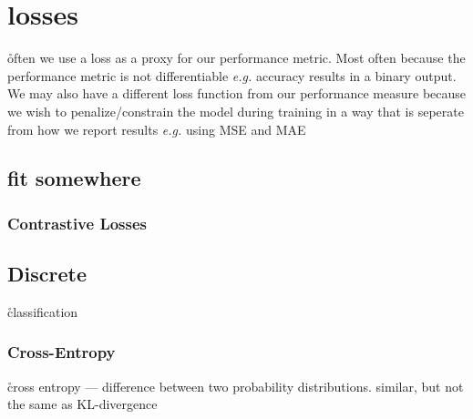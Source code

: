 
\section{losses}



\r{often we use a loss as a proxy for our performance metric. Most often because the performance metric is not differentiable \textit{e.g.} accuracy results in a binary output. We may also have a different loss function from our performance measure because we wish to penalize/constrain the model during training in a way that is seperate from how we report results \textit{e.g.} using MSE and MAE}


\subsection{fit somewhere}



\subsubsection{Contrastive Losses}



\subsection{Discrete}

\r{classification}


\subsubsection{Cross-Entropy}




\r{cross entropy --- difference between two probability distributions. similar, but not the same as KL-divergence}

